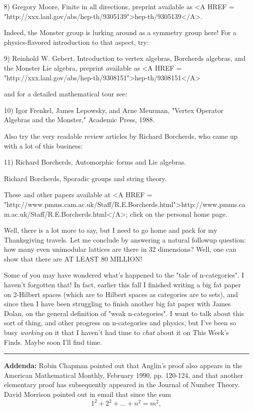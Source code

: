 8) Gregory Moore, Finite in all directions, preprint available
as <A HREF = "http://xxx.lanl.gov/abs/hep-th/9305139">hep-th/9305139</A>.
 
Indeed, the Monster group is lurking around as a symmetry group here!
For a physics-flavored introduction to that aspect, try:

9) Reinhold W. Gebert, Introduction to vertex algebras,
Borcherds algebras, and the Monster Lie algebra, preprint 
available as <A HREF = "http://xxx.lanl.gov/abs/hep-th/9308151">hep-th/9308151</A>

and for a detailed mathematical tour see:

10) Igor Frenkel, James Lepowsky, and Arne Meurman, "Vertex Operator 
Algebras and the Monster," Academic Press, 1988.  

Also try the very readable review articles by Richard Borcherds, who
came up with a lot of this business:

11) Richard Borcherds, Automorphic forms and Lie algebras.

Richard Borcherds, Sporadic groups and string theory.   

These and other papers available at 
<A HREF =
"http://www.pmms.cam.ac.uk/Staff/R.E.Borcherds.html">http://www.pmms.cam.ac.uk/Staff/R.E.Borcherds.html</A>;
click on the personal home page.

Well, there is a lot more to say, but I need to go home and pack
for my Thanksgiving travels.   Let me conclude by answering a natural
followup question: how many even unimodular lattices are there in 
32 dimensions?  Well, one can show that there are AT LEAST 80 MILLION!

Some of you may have wondered what's
happened to the "tale of n-categories".  I haven't forgotten that!
In fact, earlier this fall I finished writing a big fat paper on 
2-Hilbert spaces (which are to Hilbert spaces as categories are to
sets), and since then I have been struggling to finish another big
fat paper with James Dolan, on the general definition of "weak 
n-categories".  I want to talk about this sort of thing, and other
progress on n-categories and physics, but I've been so busy \emph{working}
on it that I haven't had time to \emph{chat} about it on This Week's Finds.
Maybe soon I'll find time.
\par\noindent\rule{\textwidth}{0.4pt}
\textbf{Addenda:} Robin Chapman pointed out that Anglin's proof also
appears in the American Mathematical Monthly, February 1990, pp. 120-124,
and that another elementary proof has subsequently appeared in the Journal 
of Number Theory.  David Morrison pointed out in email that since
the sum
$$
1^{2} + 2^{2} + ... + n^{2} = m^{2},
$$
    

